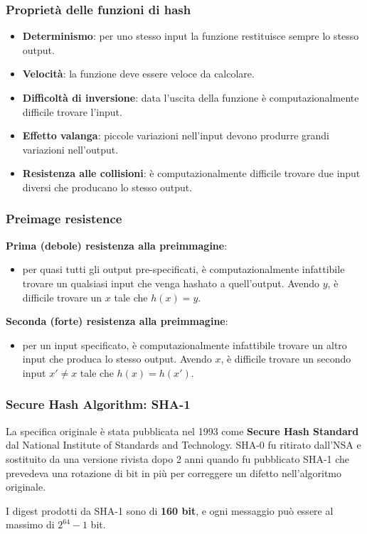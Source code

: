 \begin{frame}
\frametitle{Proprietà delle funzioni di hash}

\begin{itemize}
    \item \textbf{Determinismo}: per uno stesso input la funzione restituisce sempre lo stesso output.
    \item \textbf{Velocità}: la funzione deve essere veloce da calcolare.
    \item \textbf{Difficoltà di inversione}: data l'uscita della funzione è computazionalmente difficile trovare l'input.
    \item \textbf{Effetto valanga}: piccole variazioni nell'input devono produrre grandi variazioni nell'output.
    \item \textbf{Resistenza alle collisioni}: è computazionalmente difficile trovare due input diversi che producano lo stesso output.
\end{itemize}
\end{frame}

\begin{frame}
\frametitle{Preimage resistence}
\textbf{Prima (debole) resistenza alla preimmagine}:
\begin{itemize}
    \item per quasi tutti gli output pre-specificati, è computazionalmente infattibile trovare un qualsiasi input che venga hashato a quell'output.
    Avendo \( y \), è difficile trovare un \( x \) tale che \( h(x) = y \).
\end{itemize}
\textbf{Seconda (forte) resistenza alla preimmagine}:
\begin{itemize}
    \item per un input specificato, è computazionalmente infattibile trovare un altro input che produca lo stesso output.
     Avendo \( x \), è difficile trovare un secondo input \( x' \neq x \) tale che \( h(x) = h(x') \).
\end{itemize}

\end{frame}

\begin{frame}
\frametitle{Secure Hash Algorithm: SHA-1}

La specifica originale è stata pubblicata nel 1993 come \textbf{Secure Hash Standard} dal National Institute of Standards and Technology.
SHA-0 fu ritirato dall'NSA e sostituito da una versione rivista dopo 2 anni quando fu pubblicato SHA-1 che prevedeva una rotazione di bit in più
per correggere un difetto nell'algoritmo originale.

\vspace{1cm}

I digest prodotti da SHA-1 sono di \textbf{160 bit}, e ogni messaggio può essere al massimo di \(2^{64} - 1\) bit.
\end{frame}

